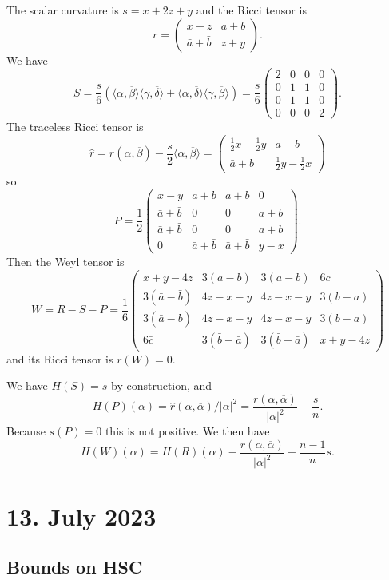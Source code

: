 \documentclass[11pt]{article}
\theoremstyle{definition}
\def\ov#1{\overline{#1}}
\def\<{\langle}
\def\>{\rangle}
\begin{document}
The scalar curvature is $s = x + 2z + y$ and the Ricci tensor is
$$
r = \begin{pmatrix}
x + z & a + b
\\
\bar a + \bar b & z + y
\end{pmatrix}.
$$
We have
$$
S = \frac{s}{6}(\<\alpha, \ov \beta\> \<\gamma, \ov \delta\>
+ \<\alpha, \ov \delta\> \<\gamma, \ov \beta\>)
= \frac{s}{6}
\begin{pmatrix}
2 & 0 & 0 & 0
\\
0 & 1 & 1 & 0
\\
0 & 1 & 1 & 0
\\
0 & 0 & 0 & 2
\end{pmatrix}.
$$
The traceless Ricci tensor is
$$
\hat r
= r(\alpha, \ov\beta) - \frac{s}{2} \<\alpha, \ov\beta\>
= \begin{pmatrix}
\frac12 x - \frac12 y & a + b
\\
\bar a + \bar b & \frac12 y - \frac12 x
\end{pmatrix}
$$
so
$$
P = \frac12
\begin{pmatrix}
x-y & a+b & a+b & 0
\\
\bar a + \bar b & 0 & 0 & a+b
\\
\bar a + \bar b & 0 & 0 & a+b
\\
0 & \bar a+\bar b & \bar a+\bar b & y-x
\end{pmatrix}.
$$
Then the Weyl tensor is
$$
W\! = R - S - P
= \frac16 \! \begin{pmatrix}
x + y - 4z & 3(a - b) & 3(a - b) & 6c
\\
3(\bar a - \bar b) & 4z - x - y & 4z - x - y & 3(b - a)
\\
3(\bar a - \bar b) & 4z - x - y & 4z - x - y & 3(b - a)
\\
6 \bar c & 3(\bar b - \bar a) & 3(\bar b - \bar a) & x + y - 4z
\end{pmatrix}
$$
and its Ricci tensor is $r(W) = 0$.

We have $H(S) = s$ by construction, and
$$
H(P)(\alpha)
= \hat r(\alpha, \ov\alpha) / |\alpha|^2
= \frac{r(\alpha, \ov\alpha)}{|\alpha|^2} - \frac{s}{n}.
$$
Because $s(P) = 0$ this is not positive.
We then have
$$
H(W)(\alpha)
= H(R)(\alpha)
- \frac{r(\alpha, \ov\alpha)}{|\alpha|^2}
- \frac{n-1}{n} s.
$$


\section{13. July 2023}

\subsection*{Bounds on HSC}
\end{document}

